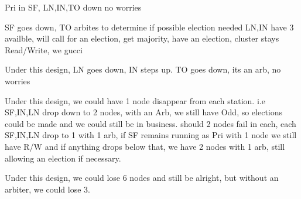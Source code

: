 Pri in SF,
LN,IN,TO down no worries

SF goes down, TO arbites to determine if possible election needed
LN,IN have 3 availble, will call for an election, get majority, have an election,
cluster stays Read/Write, we gucci

Under this design, LN goes down, IN steps up. TO goes down, its an arb, no worries

Under this design, we could have 1 node disappear from each station.
i.e SF,IN,LN drop down to 2 nodes, with an Arb, we still have Odd, so elections could be made
and we could still be in business. should 2 nodes fail in each,
each SF,IN,LN drop to 1 with 1 arb, if SF remains running as Pri with 1 node we still have R/W
and if anything drops below that, we have 2 nodes with 1 arb, still allowing an election if necessary.

Under this design, we could lose 6 nodes and still be alright, but without an arbiter,
we could lose 3.

